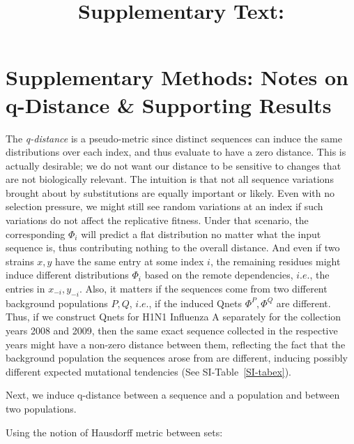 \documentclass[onecolumn,10pt]{IEEEtran}
\title{Supplementary Text: \\ \TITLE}
\begin{document}
 
\maketitle   


   


\section*{Supplementary Methods: Notes on q-Distance \& Supporting Results}

The \textit{q-distance} is a pseudo-metric since  distinct sequences can induce the same distributions over each index, and thus evaluate to have a zero distance. This is  actually desirable; we do not want our distance to be  sensitive to changes that are not biologically relevant. The intuition is that  not all sequence variations brought about by substitutions are equally important or likely. Even with no  selection pressure, we might still see random  variations at an index if such variations do not affect the replicative fitness. Under that scenario, the corresponding $\Phi_i$ will predict a flat distribution no matter what the input sequence is, thus contributing nothing to the overall distance. And even if two strains $x,y$ have the same entry at some index $i$, the remaining residues  might induce different distributions $\Phi_i$ based on the remote dependencies, $i.e.$, the entries in $x_{-i},y_{-i}$. Also, it matters if the sequences come from two different background populations $P,Q$, $i.e.$, if the induced Qnets $\Phi^P,\Phi^Q$ are different. Thus, if we construct Qnets for H1N1 Influenza A separately for the collection years 2008 and 2009, then the same exact sequence collected in the respective years might have a non-zero distance between them, reflecting the fact that the background population the sequences arose from are different, inducing possibly different expected mutational tendencies (See SI-Table~\ref{SI-tabex}).

Next, we induce q-distance  between a sequence and a population and between two populations.
\begin{defn}
Using the notion of Hausdorff metric between sets:
\end{defn}
\end{document}
